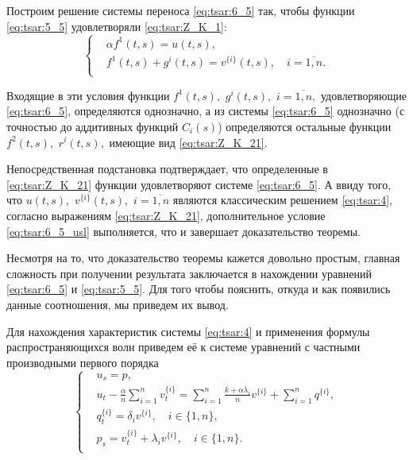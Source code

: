 Построим решение системы переноса \eqref{eq:tsar:6_5} так, 
чтобы функции \eqref{eq:tsar:5_5} удовлетворяли \eqref{eq:tsar:Z_K_1}:
$$
\left\{
\begin{aligned}
& \alpha {f^{1}}(t,s) = u(t,s), \\
& {f^{1}}(t,s) + {g^{i}}(t,s) = v^{\{i\}}(t,s), \quad i = \overline{ 1,n }.\\
\end{aligned}
\right.
$$

Входящие в эти условия функции ${f^{1}}(t,s),$ $g^{i}(t,s),$ $ i  = \overline{ 1,n },$ 
удовлетворяющие \eqref{eq:tsar:6_5}, определяются однозначно, 
а из системы \eqref{eq:tsar:6_5} однозначно (с точностью до аддитивных функций $C_i(s)$) 
определяются остальные функции ${f^{2}}(t,s),$ $r^{i}(t,s),$ имеющие вид \eqref{eq:tsar:Z_K_21}.

Непосредственная подстановка подтверждает, что определенные в \eqref{eq:tsar:Z_K_21} \linebreak
функции удовлетворяют системе  \eqref{eq:tsar:6_5}. 
А ввиду того, что $u(t,s),$ $v^{\{i\}}(t,s),$ ${i = \overline{ 1,n }}$ являются классическим решением  \eqref{eq:tsar:4}, 
согласно выражениям \eqref{eq:tsar:Z_K_21}, дополнительное условие \eqref{eq:tsar:6_5_usl} выполняется, что и завершает доказательство теоремы.

\smallskip

Несмотря на то, что доказательство теоремы кажется довольно простым, главная сложность 
при получении результата заключается в нахождении уравнений \eqref{eq:tsar:6_5} и \eqref{eq:tsar:5_5}. 
Для того чтобы пояснить, откуда и как появились данные соотношения, мы приведем их вывод.

Для нахождения характеристик системы \eqref{eq:tsar:4} и применения 
формулы распространяющихся волн приведем её к системе уравнений с частными производными первого порядка
\begin{equation}
\left\{
\begin{aligned}
&u_s=p ,\\
&u_t-\frac{\alpha}{n} \sum_{i=1}^{n} v^{\{i\}}_t = \sum_{i=1}^{n} \frac{ k + \alpha \lambda_i }{n} v^{\{i\}}+\sum_{i=1}^{n} q^{\{i\}} ,\\
&q^{\{i\}}_t = \delta_i v^{\{i\}}, \quad i \in \{1,n\} ,\\
&p_s = v^{\{i\}}_t + \lambda_i v^{\{i\}}, \quad i \in \{1,n\}. \\
\end{aligned}
\right.
\label{eq:tsar:4_}
\end{equation}

